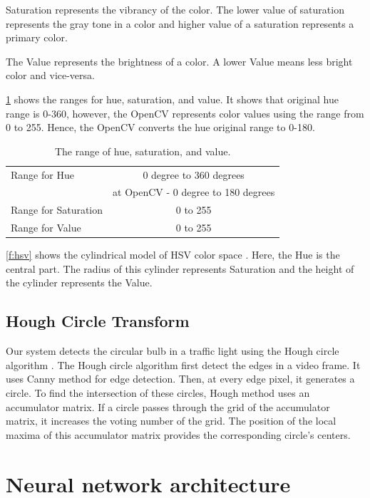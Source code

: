 Saturation represents the vibrancy of the color.
The lower value of saturation represents the gray tone in a color and higher value of a saturation represents a primary color.

The Value represents the brightness of a color.
A lower Value means less bright color and vice-versa.

\ref{t:hsv} shows the ranges for hue, saturation, and value.
It shows that original hue range is 0-360, however, the OpenCV \cite{opencv} represents color values using the range from 0 to 255. 
Hence, the OpenCV converts the hue original range to 0-180.

\begin{table}[h!]
  \centering
  \caption{The range of hue, saturation, and value.}
  \label{t:hsv}
  \begin{tabular}{  l | c  }
    
    Range for Hue & 0 degree to 360 degrees \\
    & at OpenCV - 0 degree to 180 degrees\\
    \hline
    Range for Saturation & 0 to 255 \\
    \hline 
    Range for Value & 0 to 255 \\
    
  \end{tabular}
\end{table}


\ref{f:hsv} shows the cylindrical model of HSV color space \cite{hsv}.
Here, the Hue is the central part.
The radius of this cylinder represents Saturation and the height of the cylinder represents the Value.

\subsection{Hough Circle Transform}
Our system detects the circular bulb in a traffic light using the Hough circle algorithm \cite{houghcir_alg}.
The Hough circle algorithm first detect the edges in a video frame.
It uses Canny method \cite{canny} for edge detection.
Then, at every edge pixel, it generates a circle.
To find the intersection of these circles, Hough method uses an accumulator matrix.
If a circle passes through the grid of the accumulator matrix, it increases the voting number of the grid.
The position of the local maxima of this accumulator matrix provides the corresponding circle's centers.

\section{Neural network architecture}







